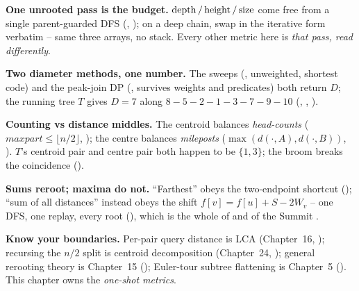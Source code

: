 \begin{quickref}
\textbf{One unrooted pass is the budget.} $\operatorname{depth}/\operatorname{height}/\operatorname{size}$ come free from a single
parent-guarded DFS (, ); on a deep chain, swap in the
iterative form  verbatim -- same three arrays, no stack. Every other metric
here is \emph{that pass, read differently}.

\medskip
\textbf{Two diameter methods, one number.} The sweeps (, unweighted,
shortest code) and the peak-join DP (, survives weights and predicates) both
return $D$; the running tree $T$ gives $D=7$ along $8\!-\!5\!-\!2\!-\!1\!-\!3\!-\!7\!-\!9\!-\!10$
(, , ).

\medskip
\textbf{Counting vs distance middles.} The centroid balances \emph{head-counts}
($\mathit{maxpart}\le\lfloor n/2\rfloor$, ); the centre balances
\emph{mileposts} ($\max(d(\cdot,A),d(\cdot,B))$, ). $T$'s centroid pair and
centre pair both happen to be $\{1,3\}$; the broom breaks the coincidence ().

\medskip
\textbf{Sums reroot; maxima do not.} ``Farthest'' obeys the two-endpoint shortcut
(); ``sum of all distances'' instead obeys the shift
$f[v]=f[u]+S-2W_v$ -- one DFS, one replay, every root (), which is the
whole of  and of the Summit .

\medskip
\textbf{Know your boundaries.} Per-pair query distance is LCA (Chapter~16, );
recursing the $n/2$ split is centroid decomposition (Chapter~24, ); general
rerooting theory is Chapter~15 (); Euler-tour subtree flattening is Chapter~5
(). This chapter owns the \emph{one-shot metrics}.
\end{quickref}


